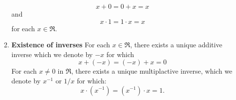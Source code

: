 \begin{itemize}
\begin{enumerate}
        \begin{equation}
            x+0=0+x=x
        \end{equation}
        and
        \begin{equation}
            x\cdot 1 = 1\cdot x=x
            \label{eq:}
        \end{equation}
        for each $x\in \Re$.
        \item \textbf{Existence of inverses} For each $x \in \Re$, there exists a unique additive inverse which we denote by $-x$ for which
        \begin{equation}
            x+(-x)=(-x)+x=0
            \label{eq:}
        \end{equation}
        For each $x\neq 0$ in $\Re$, there exists a unique multiplactive inverse, which we denote by $x^{-1}$ or $1/x$ for which:
        \begin{equation}
            x\cdot \left(x^{-1}\right) = \left(x^{-1}\right)\cdot x=1.
            \label{eq:}
        \end{equation}
        

\end{enumerate}
\end{itemize}
